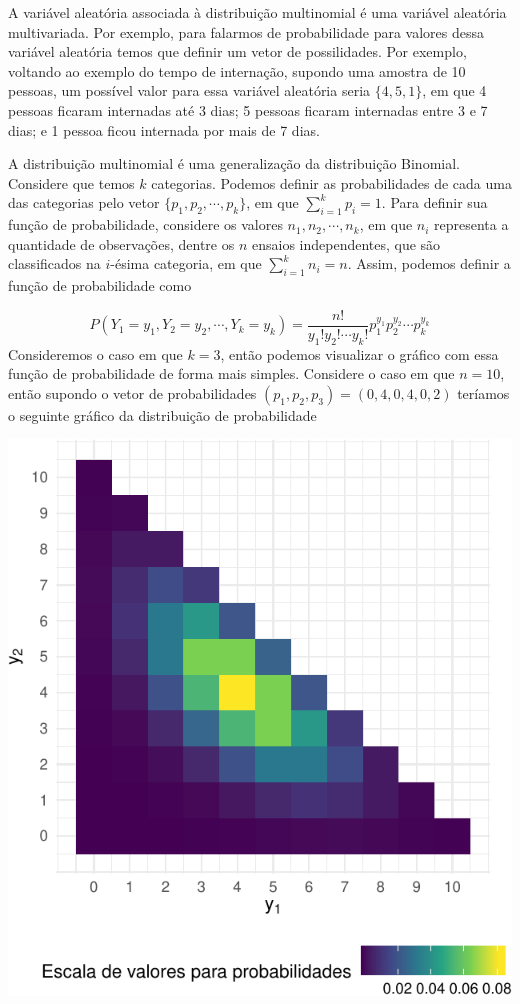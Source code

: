 \documentclass[]{book}
\begin{document}
A variável aleatória associada à distribuição multinomial é uma variável aleatória multivariada. Por exemplo, para falarmos de probabilidade para valores dessa variável aleatória temos que definir um vetor de possilidades. Por exemplo, voltando ao exemplo do tempo de internação, supondo uma amostra de 10 pessoas, um possível valor para essa variável aleatória seria \(\{4, 5, 1\}\), em que 4 pessoas ficaram internadas até 3 dias; 5 pessoas ficaram internadas entre 3 e 7 dias; e 1 pessoa ficou internada por mais de 7 dias.

A distribuição multinomial é uma generalização da distribuição Binomial. Considere que temos \(k\) categorias. Podemos definir as probabilidades de cada uma das categorias pelo vetor \(\{p_1, p_2, \cdots, p_k\}\), em que \(\sum_{i=1}^k p_i = 1\). Para definir sua função de probabilidade, considere os valores \(n_1, n_2, \cdots, n_k\), em que \(n_i\) representa a quantidade de observações, dentre os \(n\) ensaios independentes, que são classificados na \(i\)-ésima categoria, em que \(\sum_{i=1}^k n_i = n\). Assim, podemos definir a função de probabilidade como

\[
P(Y_1 = y_1, Y_2 = y_2, \cdots, Y_k = y_k) = 
\frac{n!}{y_1!y_2!\cdots y_k!} p_1^{y_1} p_2^{y_2} \cdots p_k^{y_k}
\]
Consideremos o caso em que \(k = 3\), então podemos visualizar o gráfico com essa função de probabilidade de forma mais simples. Considere o caso em que \(n = 10\), então supondo o vetor de probabilidades \((p_1, p_2, p_3) = (0,4, 0,4, 0,2)\) teríamos o seguinte gráfico da distribuição de probabilidade

\begin{center}\includegraphics[width=0.8\linewidth]{notas_livro_files/figure-latex/graf12-1} \end{center}
\end{document}
